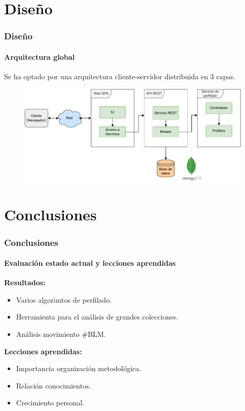 \documentclass{beamer}
\begin{document}
\section{Diseño}
	\begin{frame}
	\frametitle{Diseño}
	\framesubtitle{Arquitectura global}
	Se ha optado por una arquitectura cliente-servidor distribuida en 3 capas. \pause
	\begin{figure}[H]
		\centering
		\includegraphics[width=\textwidth]{images/arquitectura.pdf}
		\label{fig:diagrama/arquitectura}
	\end{figure}
\end{frame}


\section{Conclusiones}

	\begin{frame}
			\frametitle{Conclusiones}
			\framesubtitle{Evaluación estado actual y lecciones aprendidas}
			\vspace{0cm}
			\textbf{Resultados:}
			\begin{itemize}
				\item Varios algorimtos de perfilado.\pause
				\item Herramienta para el análisis de grandes colecciones.\pause
				\item Análisis movimiento \#BLM. 

			\end{itemize} 
			\pause
			\vspace{0.5cm}
			\textbf{Lecciones aprendidas:}  \pause
			\begin{itemize}
				\item Importancia organización metodológica. \pause
				\item Relación conocimientos. \pause
				\item Crecimiento personal.
			\end{itemize}
	\end{frame}
	
\end{document}
